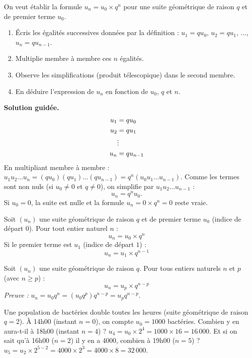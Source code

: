 \documentclass[11pt]{article}
\def\vdots{\mathord{\vbox{\baselineskip3.2pt\lineskiplimit0pt\kern4pt\hbox{.}\hbox{.}\hbox{.}}}}%
\begin{document}
\begin{experience}
On veut établir la formule $u_n = u_0 \times q^n$ pour une suite géométrique de raison $q$ et de premier terme $u_0$.
\begin{enumerate}
    \item Écris les égalités successives données par la définition : $u_1 = q u_0$, $u_2 = q u_1$, ..., $u_n = q u_{n-1}$.
    \item Multiplie membre à membre ces $n$ égalités.
    \item Observe les simplifications (produit télescopique) dans le second membre.
    \item En déduire l'expression de $u_n$ en fonction de $u_0$, $q$ et $n$.
\end{enumerate}
\tcblower
\textbf{Solution guidée.}
\begin{align*}
u_1 &= q u_0 \\
u_2 &= q u_1 \\
&\vdots \\
u_n &= q u_{n-1}
\end{align*}
En multipliant membre à membre : $u_1 u_2 \dots u_n = (q u_0)(q u_1) \dots (q u_{n-1}) = q^n (u_0 u_1 \dots u_{n-1})$.
Comme les termes sont non nuls (si $u_0 \neq 0$ et $q \neq 0$), on simplifie par $u_1 u_2 \dots u_{n-1}$ :
\[
u_n = q^n u_0.
\]
Si $u_0 = 0$, la suite est nulle et la formule $u_n = 0 \times q^n = 0$ reste vraie.
\end{experience}

\begin{propriete}
Soit $(u_n)$ une suite géométrique de raison $q$ et de premier terme $u_0$ (indice de départ $0$).
Pour tout entier naturel $n$ :
\[
\boxed{u_n = u_0 \times q^n}
\]
Si le premier terme est $u_1$ (indice de départ $1$) :
\[
\boxed{u_n = u_1 \times q^{n-1}}
\]
\end{propriete}

\begin{propriete}
Soit $(u_n)$ une suite géométrique de raison $q$. Pour tous entiers naturels $n$ et $p$ (avec $n \ge p$) :
\[
\boxed{u_n = u_p \times q^{n-p}}
\]
\textit{Preuve :} $u_n = u_0 q^n = (u_0 q^p) q^{n-p} = u_p q^{n-p}$.
\end{propriete}

\begin{exemplebox}
Une population de bactéries double toutes les heures (suite géométrique de raison $q=2$).
À 14h00 (instant $n=0$), on compte $u_0 = 1000$ bactéries.
Combien y en aura-t-il à 18h00 (instant $n=4$) ?
$u_4 = u_0 \times 2^4 = 1000 \times 16 = 16\,000$.
Et si on sait qu'à 16h00 ($n=2$) il y en a $4000$, combien à 19h00 ($n=5$) ?
$u_5 = u_2 \times 2^{5-2} = 4000 \times 2^3 = 4000 \times 8 = 32\,000$.
\end{exemplebox}
\end{document}
